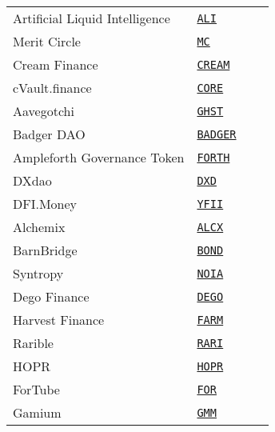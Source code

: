 \begin{tabular}{llll}
Artificial Liquid Intelligence & \href{https://etherscan.io/address/0x6b0b3a982b4634ac68dd83a4dbf02311ce324181}{\tt ALI} \\
Merit Circle & \href{https://etherscan.io/address/0x949d48eca67b17269629c7194f4b727d4ef9e5d6}{\tt MC} \\
Cream Finance & \href{https://etherscan.io/address/0x2ba592f78db6436527729929aaf6c908497cb200}{\tt CREAM} \\
cVault.finance & \href{https://etherscan.io/address/0x62359ed7505efc61ff1d56fef82158ccaffa23d7}{\tt CORE} \\
Aavegotchi & \href{https://etherscan.io/address/0x3F382DbD960E3a9bbCeaE22651E88158d2791550}{\tt GHST} \\
Badger DAO & \href{https://etherscan.io/address/0x3472a5a71965499acd81997a54bba8d852c6e53d}{\tt BADGER} \\
Ampleforth Governance Token & \href{https://etherscan.io/address/0x77fba179c79de5b7653f68b5039af940ada60ce0}{\tt FORTH} \\
DXdao & \href{https://etherscan.io/address/0xa1d65e8fb6e87b60feccbc582f7f97804b725521}{\tt DXD} \\
DFI.Money & \href{https://etherscan.io/address/0xa1d0E215a23d7030842FC67cE582a6aFa3CCaB83}{\tt YFII} \\
Alchemix & \href{https://etherscan.io/address/0xdbdb4d16eda451d0503b854cf79d55697f90c8df}{\tt ALCX} \\
BarnBridge & \href{https://etherscan.io/address/0x0391D2021f89DC339F60Fff84546EA23E337750f}{\tt BOND} \\
Syntropy & \href{https://etherscan.io/address/0xa8c8CfB141A3bB59FEA1E2ea6B79b5ECBCD7b6ca}{\tt NOIA} \\
Dego Finance & \href{https://etherscan.io/address/0x3da932456d082cba208feb0b096d49b202bf89c8}{\tt DEGO} \\
Harvest Finance & \href{https://etherscan.io/address/0xa0246c9032bC3A600820415aE600c6388619A14D}{\tt FARM} \\
Rarible & \href{https://etherscan.io/address/0xfca59cd816ab1ead66534d82bc21e7515ce441cf}{\tt RARI} \\
HOPR & \href{https://etherscan.io/address/0xf5581dfefd8fb0e4aec526be659cfab1f8c781da}{\tt HOPR} \\
ForTube & \href{https://etherscan.io/address/0x1fcdce58959f536621d76f5b7ffb955baa5a672f}{\tt FOR} \\
Gamium & \href{https://etherscan.io/address/0x4B19C70Da4c6fA4bAa0660825e889d2F7eaBc279}{\tt GMM} \\

\end{tabular}

